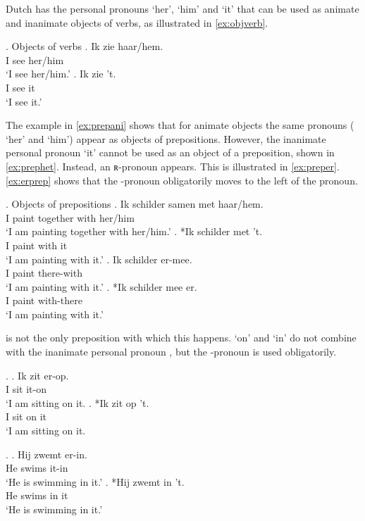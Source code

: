 \documentclass{article}
\begin{document}
Dutch has the personal pronouns  `her',  `him' and  `it' that can be used as animate and inanimate objects of verbs, as illustrated in \ref{ex:objverb}.

 \ex. Objects of verbs \label{ex:objverb}
 \ag. Ik zie haar/hem.\\
  I see her/him\\
  `I see her/him.'\label{ex:aniobj}
 \bg. Ik zie 't.\\
  I see it\\
  `I see it.'\label{ex:inaniobj}

The example in \ref{ex:prepani} shows that for animate objects the same pronouns ( `her' and  `him') appear as objects of prepositions. However, the inanimate personal pronoun  `it' cannot be used as an object of a preposition, shown in \ref{ex:prephet}. Instead, an ʀ-pronoun appears. This is illustrated in \ref{ex:preper}. \ref{ex:erprep} shows that the -pronoun obligatorily moves to the left of the pronoun.

\ex. Objects of prepositions \label{ex:objprep}
\ag. Ik schilder samen met haar/hem.\\
 I paint together with her/him\\
 `I am painting together with her/him.'\label{ex:prepani}
\bg. *Ik schilder met 't.\\
 I paint with it\\
 `I am painting with it.'\label{ex:prephet}
\bg. Ik schilder er-mee.\\
 I paint there-with\\
 `I am painting with it.'\label{ex:preper}
\bg. *Ik schilder mee er.\\
 I paint with-there\\
 `I am painting with it.'\label{ex:erprep}

 is not the only preposition with which this happens.  `on' and  `in' do not combine with the inanimate personal pronoun , but the -pronoun is used obligatorily.

\ex.
\ag. Ik zit er-op.\\
 I sit it-on\\
 `I am sitting on it.
\bg. *Ik zit op 't.\\
 I sit on it\\
 `I am sitting on it.

\ex.
 \ag. Hij zwemt er-in.\\
  He swims it-in\\
  `He is swimming in it.'
 \bg. *Hij zwemt in 't.\\
  He swims in it\\
  `He is swimming in it.'
\end{document}
